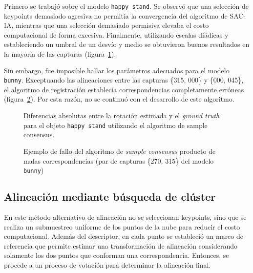 			Primero se trabajó sobre el modelo \texttt{happy stand}.
			Se observó que una selección de keypoints demasiado agresiva no permitía la convergencia del algoritmo de SAC-IA,
			mientras que una selección demasiado permisiva elevaba el costo computacional de forma excesiva.
			Finalmente, utilizando escalas diádicas y estableciendo un umbral de un desvío y medio
			se obtuvieron buenos resultados en la mayoría de las capturas (figura~\ref{fig:dif_rot_happy_sac}).

			Sin embargo, fue imposible hallar los parámetros adecuados para el modelo \texttt{bunny}.
			Exceptuando las alineaciones entre las capturas \{315, 000\} y \{000, 045\},
			el algoritmo de registración establecía correspondencias completamente erróneas (figura~\ref{fig:align_sac}).
			Por esta razón, no se continuó con el desarrollo de este algoritmo.

			\begin{figure}
				
				\caption[Diferencias en la rotación estimada para el objeto \texttt{happy stand} (SAC-IA)]
				{\label{fig:dif_rot_happy_sac}Diferencias absolutas entre la rotación estimada y el \emph{ground truth} para el objeto \texttt{happy stand}
				utilizando el algoritmo de sample consensus.}
			\end{figure}

			\begin{figure}
				\caption[Fallo en el algoritmo de \emph{sample consensus}]{\label{fig:align_sac}Ejemplo de fallo del algoritmo de \emph{sample consensus} producto de malas correspondencias
				(par de capturas \{270, 315\} del modelo \texttt{bunny})}
			\end{figure}


	\subsection{Alineación mediante búsqueda de clúster}
		En este método alternativo de alineación no se seleccionan keypoints,
		sino que se realiza un submuestreo uniforme de los puntos de la nube
		para reducir el costo computacional.
		Además del descriptor, en cada punto se estableció un marco de referencia
		que permite estimar una transformación de alineación
		considerando solamente los dos puntos que conforman una correspondencia\cite{ISS}.
		Entonces, se procede a un proceso de votación para determinar la alineación final.

